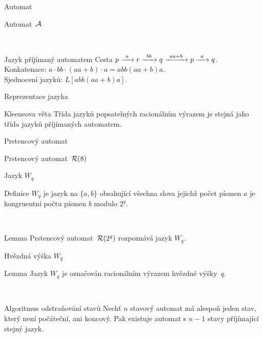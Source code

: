 \documentclass{beamer}
\begin{document}
\begin{frame}{Automat}
      \begin{exampleblock}{Automat~${\mathcal{A}}$}
            \centering
            
      \end{exampleblock}

      ~
      \pause

      \begin{block}{Jazyk příjímaný automatem}
            Cesta $p {\; \xrightarrow[]{\: \; a \: \;} \;} r {\; \xrightarrow[]{\: \; bb \: \;} \;} q {\; \xrightarrow[]{\: \; aa+b \: \;} \;} p {\; \xrightarrow[]{\: \; a \: \;} \;} q$. \\
            Konkatenace: $a \cdot bb \cdot (aa+b) \cdot a = abb(aa+b)a$. \\
            Sjednocení jazyků: $L[abb(aa+b)a]$.
      \end{block}

\end{frame}

\begin{frame}{Reprezentace jazyka}
      \begin{block}{Kleeneova věta}
            Třída jazyků popsatelných racionálním výrazem je stejná jako třída jazyků příjímaných automatem.
      \end{block}
\end{frame}

\begin{frame}{Prstencový automat}
      \begin{exampleblock}{Prstencový automat~${\mathcal{R}}(8)$}
            \begin{center}
                  
            \end{center}
      \end{exampleblock}
\end{frame}

\begin{frame}{Jazyk $W_q$}
      \begin{block}{Definice}
            $W_q$ je jazyk na ${\{a, b\}}$ obsahující všechna slova jejichž počet písmen $a$ je kongruentní počtu písmen $b$ modulo $2^q$.
      \end{block}

      ~
      \pause

      \begin{block}{Lemma}
            Prstencový automat~${\mathcal{R}}(2^q)$ rozpoznává jazyk $W_q$.
      \end{block}
\end{frame}

\begin{frame}{Hvězdná výška $W_q$}
      \begin{block}{Lemma}
            Jazyk $W_q$ je označován racionálním výrazem hvězdné výšky~$q$.
      \end{block}

      ~
      \pause

      \begin{block}{Algoritmus odstraňování stavů}
            Nechť $n$ stavový automat má alespoň jeden stav, který není počáteční, ani koncový. Pak existuje automat s $n-1$ stavy příjímající stejný jazyk.
      \end{block}
\end{frame}
\end{document}
